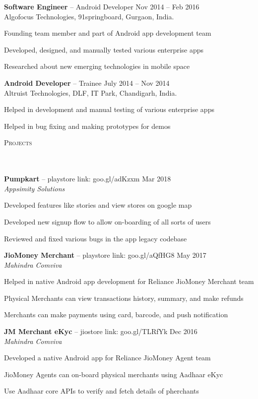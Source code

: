 \documentclass{article}
\newcommand{\header}[1]{{
\hspace*{-15pt}\vspace*{6pt} \textsc{#1}} \vspace*{-6pt} 
\lineunder
}
\newcommand{\lineunder}{
\vspace*{-8pt} \\ \hspace*{-18pt} 
\hrulefill \\
}
\newcommand{\employer}[4]{{
\vspace*{2pt}%
\textbf{#1} #2 \hfill #3\\ #4 \vspace*{2pt}}
}
\newcommand{\project}[4]{{
\vspace*{2pt}%
\textbf{#1} #2 \hfill #3\\ \textit{#4} \vspace*{2pt}}
}
\renewcommand{\labelitemii}{
$\vcenter{\hbox{\tiny$\bullet$}}$\hspace*{-3pt}
}
\newenvironment{bullet-list-minor}{
\begin{list}{\labelitemii}{\setlength\leftmargin{15pt} 
\topsep 0pt \itemsep -2pt}}{\vspace*{4pt}\end{list}
}
\begin{document}
    \employer{Software Engineer}{-- Android Developer}{Nov 2014 -- Feb 2016}{Algofocus Technologies, 91springboard, Gurgaon, India.}
	\begin{bullet-list-minor}
	\item Founding team member and part of Android app development team
	\item Developed, designed, and manually tested various enterprise apps
	\item Researched about new emerging technologies in mobile space
    \end{bullet-list-minor}

    \employer{Android Developer}{-- Trainee}{July 2014 -- Nov 2014}{Altruist Technologies, DLF, IT Park, Chandigarh, India.}
	\begin{bullet-list-minor}
	\item Helped in development and manual testing of various enterprise apps
	\item Helped in bug fixing and making prototypes for demos
    \end{bullet-list-minor}

\vspace*{4pt}%
\header{Projects}
    \project{Pumpkart}{-- playstore link: goo.gl/adKzxm}{Mar 2018}{Appsimity Solutions}
	\begin{bullet-list-minor}
	\item Developed features like stories and view stores on google map
	\item Developed new signup flow to allow on-boarding of all sorts of users
	\item Reviewed and fixed various bugs in the app legacy codebase
    \end{bullet-list-minor}

    \project{JioMoney Merchant}{-- playstore link: goo.gl/aQfHG8}{May 2017}{Mahindra Comviva}
	\begin{bullet-list-minor}
	\item Helped in native Android app development for Reliance JioMoney Merchant team
	\item Physical Merchants can view transactions history, summary, and make refunds
	\item Merchants can make payments using card, barcode, and push notification
    \end{bullet-list-minor}

    \project{JM Merchant eKyc}{-- jiostore link: goo.gl/TLRfYk}{Dec 2016}{Mahindra Comviva}
	\begin{bullet-list-minor}
	\item Developed a native Android app for Reliance JioMoney Agent team
	\item JioMoney Agents can on-board physical merchants using Aadhaar eKyc
	\item Use Aadhaar core APIs to verify and fetch details of pherchants
    \end{bullet-list-minor}
\end{document}
